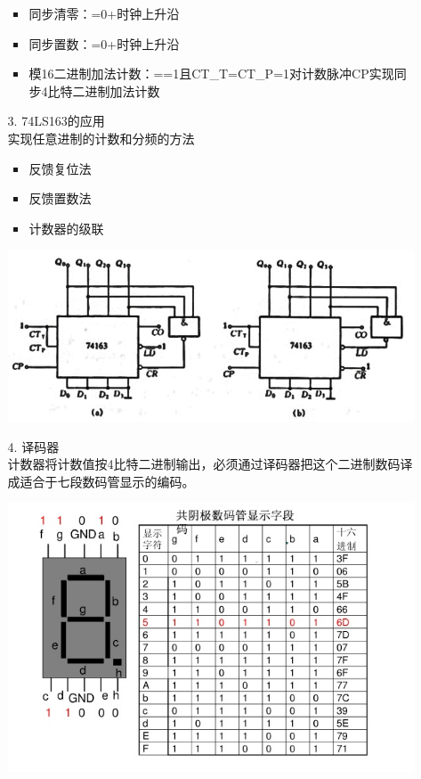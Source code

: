 \documentclass[UTF8]{ctexart}
\begin{document}
\begin{enumerate}
\begin{itemize}
                    \begin{itemize}
                        \item 同步清零：=0+时钟上升沿
                        \item 同步置数：=0+时钟上升沿
                        \item 模16二进制加法计数：==1且CT_T=CT_P=1对计数脉冲CP实现同步4比特二进制加法计数
                    \end{itemize}
              \item [3.] 74LS163的应用                  \\
                    实现任意进制的计数和分频的方法\\
                    \begin{itemize}
                        \item 反馈复位法
                        \item 反馈置数法
                        \item 计数器的级联
                    \end{itemize}
                    \begin{center}
                        \includegraphics[scale = 0.6]{3.png}
                        \label{fig:label}
                    \end{center}
              \item [4.] 译码器\\
                    计数器将计数值按4比特二进制输出，必须通过译码器把这个二进制数码译成适合于七段数码管显示的编码。\\
                    \begin{center}
                        \includegraphics[scale = 0.6]{4.png}

\end{center}
\end{itemize}
\end{enumerate}
\end{document}
